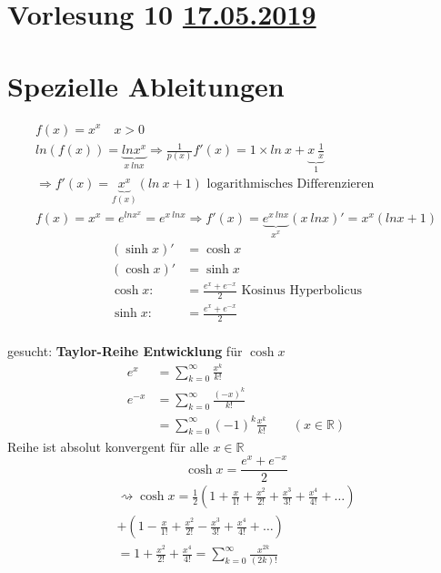 \section{Vorlesung 10 \href{https://tu-dresden.de/mn/math/algebra/das-institut/beschaeftigte/antje-noack/ressourcen/dateien/v120-1/MathMethInf10.pdf?lang=en}{17.05.2019}}
\section{Spezielle Ableitungen }
\begin{gather*}
f(x) = x^x \quad x>0\\
ln(f(x)) = \underbrace{ln  x^x}_{x \: ln  x } \Rightarrow \frac{1}{p(x)}f'(x) = 1 \times ln \ x + \underbrace{x \ \frac{1}{x}}_{1}\\
\Rightarrow f'(x) = \underbrace{x^x }_{f(x)}(ln \ x + 1) \text{ logarithmisches Differenzieren }\\
f(x) = x^x = e^{ln  x^x} = e^{x \ ln x} \Rightarrow f'(x)= \underbrace{e^{x \ ln  x}}_{x^x}(x \ ln  x)' = x^x (ln  x + 1) 
\end{gather*}
\begin{align*}
(\sinh  x)'&= \cosh  x\\
(\cosh  x)'&= \sinh x\\
\cosh x:&= \frac{e^x + e^{-x}}{2} \text{ Kosinus Hyperbolicus}\\
\sinh x:&= \frac{e^x + e^{-x}}{2}\\
\end{align*}

gesucht: \textbf{Taylor-Reihe Entwicklung} für $\cosh x$\\
\begin{align*}
e^x &= \sum_{ k = 0 }^{ \infty }{ \frac{x^k}{k!} }\\
e^{-x} &= \sum_{ k = 0 }^{\infty}{\frac{(-x)^k}{k!}}\\
&= \sum_{ k = 0 }^{\infty}{(-1)^k\frac{x^k}{k!}}
\qquad (x \in \mathbb{R})
\end{align*}
Reihe ist absolut konvergent für alle $ x \in \mathbb{R}$ \\
\[\cosh x= \frac{e^x + e^{-x}}{2}\]
\begin{gather*}
\rightsquigarrow \cosh x= \frac{1}{2}(1+\frac{x}{1!}+ \frac{x^2}{2!} + \frac{x^3}{3!}+\frac{x^4}{4!} + \dots )\\
+(1-\frac{x}{1!}+ \frac{x^2}{2!} - \frac{x^3}{3!}+\frac{x^4}{4!} + \dots)\\
=1 + \frac{x^2}{2!}+  \frac{x^4}{4!} = \sum_{k=0}^{\infty}{\frac{x^{2k}}{(2k)!}}
\end{gather*}
